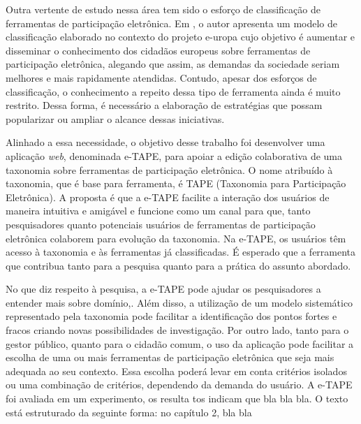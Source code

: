 Outra vertente de estudo nessa área tem sido o esforço de classificação de ferramentas de participação eletrônica. Em  , o autor apresenta um modelo de classificação elaborado no contexto do projeto \acrfull{e-uropa} cujo objetivo é aumentar e disseminar o conhecimento dos cidadãos europeus sobre ferramentas de participação eletrônica, alegando que assim, as demandas da sociedade seriam melhores e mais rapidamente atendidas. Contudo, apesar dos esforços de classificação, o conhecimento a repeito dessa tipo de ferramenta ainda é muito restrito. Dessa forma, é necessário a elaboração de estratégias que possam popularizar ou ampliar o alcance dessas iniciativas. 
\par
Alinhado a essa necessidade, o objetivo desse trabalho foi desenvolver uma aplicação \textit{web}, denominada e-TAPE, para apoiar a edição colaborativa de uma taxonomia sobre ferramentas de participação eletrônica. O nome atribuído à taxonomia, que é base para ferramenta, é TAPE (Taxonomia para Participação Eletrônica). A proposta é que a e-TAPE facilite a interação dos usuários de maneira intuitiva e amigável e funcione como um canal para que, tanto pesquisadores quanto potenciais usuários de ferramentas de participação eletrônica colaborem para evolução da taxonomia. Na e-TAPE, os usuários têm acesso à taxonomia e às ferramentas já classificadas.
É esperado que a ferramenta que contribua tanto para a pesquisa quanto para a prática do assunto abordado. 
\par
No que diz respeito à pesquisa, a e-TAPE pode ajudar os pesquisadores a entender mais sobre domínio,. Além disso, a utilização de um modelo sistemático representado pela taxonomia pode facilitar a identificação dos pontos fortes e fracos criando novas possibilidades de investigação. Por outro lado, tanto para o gestor público, quanto para o cidadão comum, o uso da aplicação pode facilitar a escolha de uma ou mais ferramentas de participação eletrônica que seja mais adequada ao seu contexto. Essa escolha poderá levar em conta critérios isolados ou uma combinação de critérios, dependendo da demanda do usuário.
A e-TAPE foi avaliada em um experimento, os resulta tos indicam que bla bla bla. 
O texto está estruturado da seguinte forma: no capítulo 2, bla bla 
